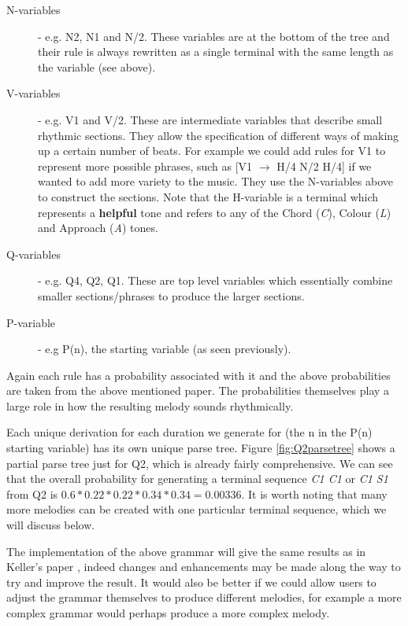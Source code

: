 \documentclass[pdftex,12pt,a4paper]{report}
\begin{document}
\begin{description}
  \item[N-variables] - e.g. N2, N1 and N/2. These variables are at the bottom of the tree and their rule is always rewritten as a single terminal with the same length as the variable (see above).
  \item[V-variables]  - e.g. V1 and V/2. These are intermediate variables that describe small rhythmic sections. They allow the specification of different ways of making up a certain number of beats. For example we could add rules for V1 to represent more possible phrases, such as [V1 $\rightarrow$ H/4 N/2 H/4] if we wanted to add more variety to the music. They use the N-variables above to construct the sections. Note that the H-variable is a terminal which represents a \textbf{helpful} tone and refers to any of the Chord (\textit{C}), Colour (\textit{L}) and Approach (\textit{A}) tones.
  \item[Q-variables] - e.g. Q4, Q2, Q1. These are top level variables which essentially combine smaller sections/phrases to produce the larger sections. 
  \item[P-variable] - e.g P(n), the starting variable (as seen previously).
\end{description}

Again each rule has a probability associated with it and the above probabilities are taken from the above mentioned paper. The probabilities themselves play a large role in how the resulting melody sounds rhythmically.

Each unique derivation for each duration we generate for (the n in the P(n) starting variable) has its own unique parse tree. Figure \ref{fig:Q2parsetree} shows a partial parse tree just for Q2, which is already fairly comprehensive. We can see that the overall probability for generating a terminal sequence \emph{C1 C1} or \emph{C1 S1} from Q2 is $0.6*0.22*0.22*0.34*0.34= 0.00336$. It is worth noting that many more melodies can be created with one particular terminal sequence, which we will discuss below.

The implementation of the above grammar will give the same results as in Keller's paper \cite{keller07}, indeed changes and enhancements may be made along the way to try and improve the result. 
It would also be better if we could allow users to adjust the grammar themselves to produce different melodies, for example a more complex grammar would perhaps produce a more complex melody. \
\end{document}

